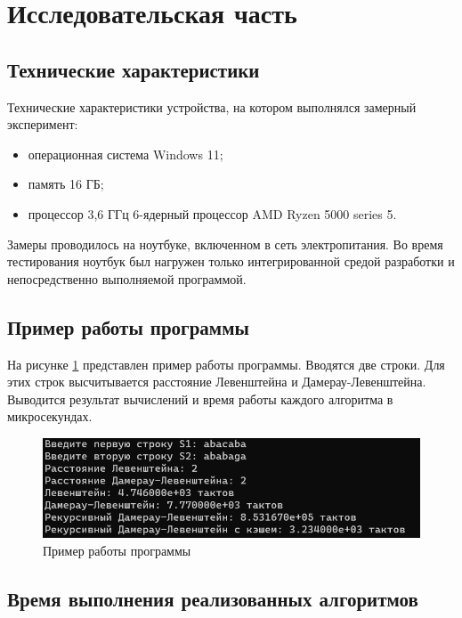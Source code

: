 \section{Исследовательская часть}

\subsection{Технические характеристики}

Технические характеристики устройства, на котором выполнялся замерный эксперимент:
\begin{itemize}[label*=---]
	\item операционная система Windows 11;
	\item память 16 ГБ;
	\item процессор 3,6 ГГц 6-ядерный процессор AMD Ryzen 5000 series 5.
\end{itemize}

Замеры проводилось на ноутбуке, включенном в сеть электропитания. 
Во время тестирования ноутбук был нагружен только интегрированной средой разработки и непосредственно выполняемой программой.

\subsection{Пример работы программы}

На рисунке \ref{img:example} представлен пример работы программы. 
Вводятся две строки. 
Для этих строк высчитывается расстояние Левенштейна и Дамерау-Левенштейна.
Выводится результат вычислений и время работы каждого алгоритма в микросекундах. 

\begin{figure}[!h]
	\centering
	\includegraphics[width=130mm]{images/example}
	\caption{Пример работы программы}
	\label{img:example}
\end{figure}

\pagebreak
\newpage
\subsection{Время выполнения реализованных алгоритмов}

